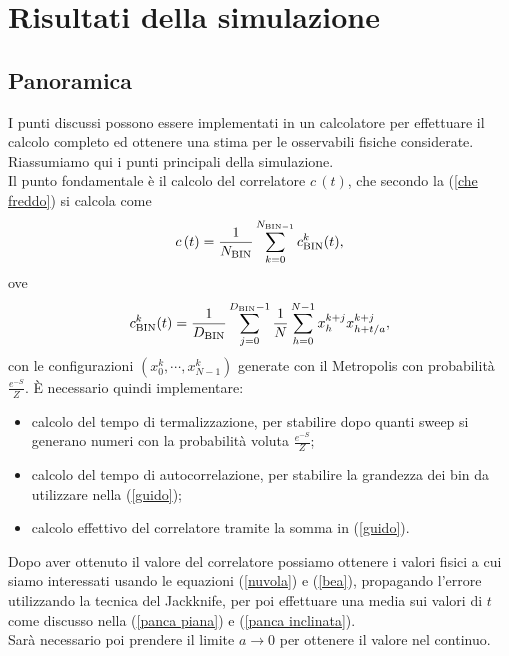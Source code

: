 \documentclass{article}
\begin{document}
\newpage
\section{Risultati della simulazione}

\subsection{Panoramica}
I punti discussi possono essere implementati in un calcolatore per effettuare il calcolo completo ed ottenere una stima per le osservabili fisiche considerate. Riassumiamo qui i punti principali della simulazione. \\ Il punto fondamentale è il calcolo del correlatore $c\,(t)$, che secondo la 
(\ref{che freddo}) si calcola come 
\begin{equation}
    c\,(t)= \frac{1}{N_{\textup{BIN}}} \sum_{k=0}^{N_{\textup{BIN}-1}} c_{\textup{BIN}}^k(t),
\end{equation}
ove 
\begin{equation}
    \label{guido}
    c^k_{\textup{BIN}}(t)=\frac{1}{D_{\textup{BIN}}}\sum_{j=0}^{D_{\textup{BIN}}-1} \frac{1}{N}\sum_{h=0}^{N-1} x_{h}^{k+j}x_{h+t/a}^{k+j},
\end{equation}
con le configurazioni $(x_0^k,\cdots, x_{N-1}^k)$ generate con il Metropolis con probabilità $\frac{e^{-S}}{Z}$. È necessario quindi implementare:
\begin{itemize}
    \item calcolo del tempo di termalizzazione, per stabilire dopo quanti sweep si generano numeri con la probabilità voluta $\frac{e^{-S}}{Z}$;
    \item calcolo del tempo di autocorrelazione, per stabilire la grandezza dei bin da utilizzare nella (\ref{guido});
    \item calcolo effettivo del correlatore tramite la somma in (\ref{guido}).
\end{itemize}
Dopo aver ottenuto il valore del correlatore possiamo ottenere i valori fisici a cui siamo interessati usando le equazioni (\ref{nuvola}) e (\ref{bea}), propagando l'errore utilizzando la tecnica del Jackknife, per poi effettuare una media sui valori di $t$ come discusso nella (\ref{panca piana}) e (\ref{panca inclinata}). \\ Sarà necessario poi prendere il limite $a\rightarrow 0$ per ottenere il valore nel continuo. 
\end{document}
